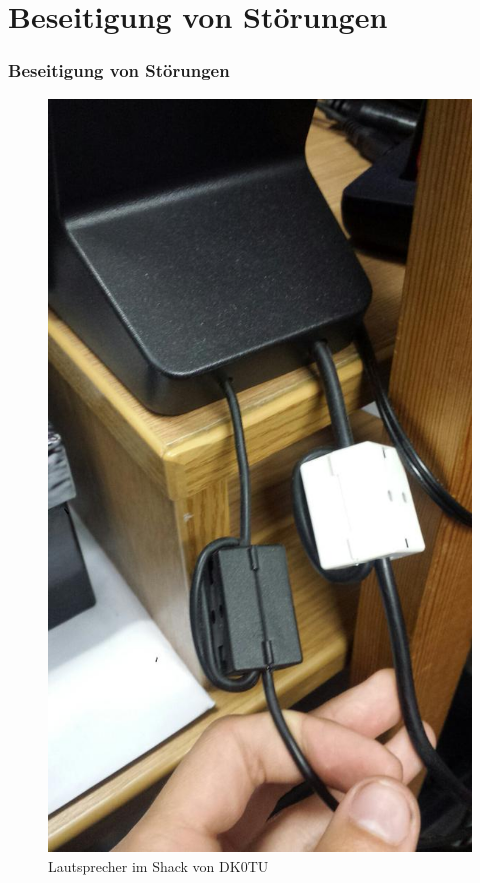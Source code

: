 \section*{Beseitigung von Störungen}

\begin{frame}
  \frametitle{Beseitigung von Störungen}
  \begin{center}
    \begin{figure}
      \includegraphics[width=\textwidth,height=0.75\textheight,keepaspectratio]{a19/2Filter.jpg}
      \caption{Lautsprecher im Shack von DK0TU}
    \end{figure}
  \end{center}
\end{frame}

